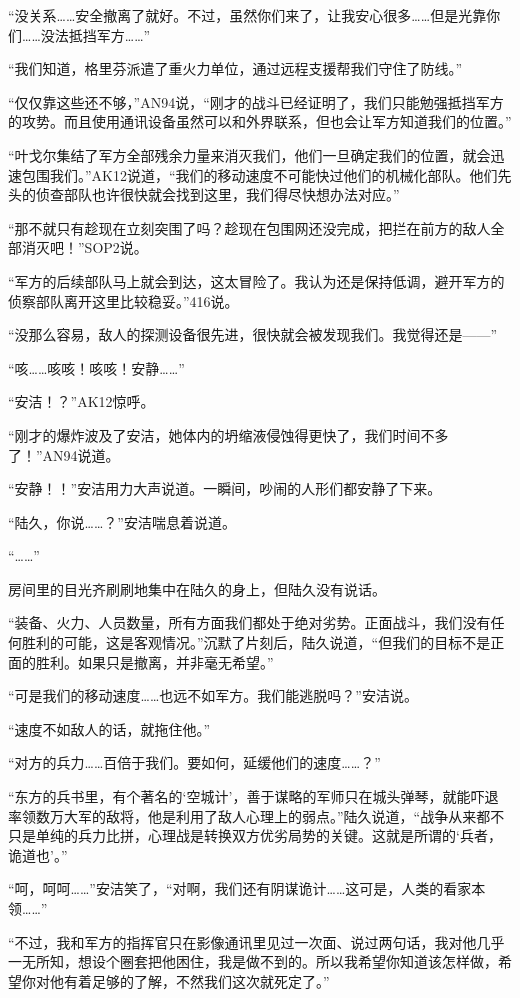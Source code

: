 “没关系……安全撤离了就好。不过，虽然你们来了，让我安心很多……但是光靠你们……没法抵挡军方……”

“我们知道，格里芬派遣了重火力单位，通过远程支援帮我们守住了防线。”

“仅仅靠这些还不够，”AN94说，“刚才的战斗已经证明了，我们只能勉强抵挡军方的攻势。而且使用通讯设备虽然可以和外界联系，但也会让军方知道我们的位置。”

“叶戈尔集结了军方全部残余力量来消灭我们，他们一旦确定我们的位置，就会迅速包围我们。”AK12说道，“我们的移动速度不可能快过他们的机械化部队。他们先头的侦查部队也许很快就会找到这里，我们得尽快想办法对应。”

“那不就只有趁现在立刻突围了吗？趁现在包围网还没完成，把拦在前方的敌人全部消灭吧！”SOP2说。

“军方的后续部队马上就会到达，这太冒险了。我认为还是保持低调，避开军方的侦察部队离开这里比较稳妥。”416说。

“没那么容易，敌人的探测设备很先进，很快就会被发现我们。我觉得还是——”

“咳……咳咳！咳咳！安静……”

“安洁！？”AK12惊呼。

“刚才的爆炸波及了安洁，她体内的坍缩液侵蚀得更快了，我们时间不多了！”AN94说道。

“安静！！”安洁用力大声说道。一瞬间，吵闹的人形们都安静了下来。

“陆久，你说……？”安洁喘息着说道。

“……”

房间里的目光齐刷刷地集中在陆久的身上，但陆久没有说话。

“装备、火力、人员数量，所有方面我们都处于绝对劣势。正面战斗，我们没有任何胜利的可能，这是客观情况。”沉默了片刻后，陆久说道，“但我们的目标不是正面的胜利。如果只是撤离，并非毫无希望。”

“可是我们的移动速度……也远不如军方。我们能逃脱吗？”安洁说。

“速度不如敌人的话，就拖住他。”

“对方的兵力……百倍于我们。要如何，延缓他们的速度……？”

“东方的兵书里，有个著名的‘空城计’，善于谋略的军师只在城头弹琴，就能吓退率领数万大军的敌将，他是利用了敌人心理上的弱点。”陆久说道，“战争从来都不只是单纯的兵力比拼，心理战是转换双方优劣局势的关键。这就是所谓的‘兵者，诡道也’。”

“呵，呵呵……”安洁笑了，“对啊，我们还有阴谋诡计……这可是，人类的看家本领……”

“不过，我和军方的指挥官只在影像通讯里见过一次面、说过两句话，我对他几乎一无所知，想设个圈套把他困住，我是做不到的。所以我希望你知道该怎样做，希望你对他有着足够的了解，不然我们这次就死定了。”

